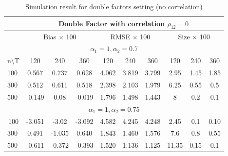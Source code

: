 \begin{table}[!hbt]
		\caption{Simulation result for double factors setting (no correlation)}\label{table:exp2}
	\centering
	\begin{tabular}{lccccccccc}
		\hline
		\hline
\multicolumn{1}{l|}{}                   & \multicolumn{9}{c}{Double Factor with correlation $\rho_{12} = 0$}                                                                \\ \hline
\multicolumn{1}{l|}{}                   & \multicolumn{3}{c|}{Bias $\times$ 100}        & \multicolumn{3}{c|}{RMSE $\times$ 100}      & \multicolumn{3}{c}{Size $\times$ 100} \\ \hline
\multicolumn{10}{c}{$\alpha_1 = 1, \alpha_2  = 0.7$}                                                                                                                           \\ \hline
\multicolumn{1}{l|}{n\textbackslash{}T} & 120    & 240    & \multicolumn{1}{c|}{360}    & 120    & 240   & \multicolumn{1}{c|}{360}   & 120         & 240        & 360         \\ \hline
\multicolumn{1}{l|}{100}                & 0.567  & 0.737  & \multicolumn{1}{c|}{0.628}  & 4.062  & 3.819 & \multicolumn{1}{c|}{3.799} & 2.95        & 1.45       & 1.85        \\
\multicolumn{1}{l|}{300}                & 0.512  & 0.611  & \multicolumn{1}{c|}{0.518}  & 2.398  & 2.103 & \multicolumn{1}{c|}{1.979} & 6.25        & 0.55       & 0.5         \\
\multicolumn{1}{l|}{500}                & -0.149 & 0.08   & \multicolumn{1}{c|}{-0.019} & 1.796  & 1.498 & \multicolumn{1}{c|}{1.443} & 8           & 0.2        & 0.1         \\ \hline
\multicolumn{10}{c}{$\alpha_1 = 1, \alpha_2 =0.75$}                                                                                                                              \\ \hline
\multicolumn{1}{c|}{100}                & -3.051 & -3.02  & \multicolumn{1}{c|}{-3.092} & 4.582  & 4.245 & \multicolumn{1}{c|}{4.248} & 2.45        & 0.1        & 0.10        \\
\multicolumn{1}{l|}{300}                & 0.491  & -1.035 & \multicolumn{1}{c|}{0.640}  & 1.843  & 1.460 & \multicolumn{1}{c|}{1.576} & 7.6         & 0.8        & 0.55        \\
\multicolumn{1}{l|}{500}                & -0.611 & -0.372 & \multicolumn{1}{c|}{-0.393} & 1.520  & 1.136 & \multicolumn{1}{c|}{1.125} & 11.35       & 0.15       & 0.1         \\ \hline

\end{tabular}
\end{table}

